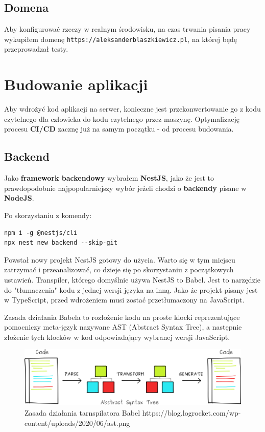 \documentclass{article}
\begin{document}
\subsection{Domena}

Aby konfigurować rzeczy w realnym środowisku, na czas trwania pisania pracy wykupiłem domenę 
\lstinline|https://aleksanderblaszkiewicz.pl|, na której będę przeprowadzał testy.

\section{Budowanie aplikacji} \label{sectionBudowanieAplikacji}

Aby wdrożyć kod aplikacji na serwer, konieczne jest przekonwertowanie go z kodu czytelnego dla człowieka do kodu czytelnego przez maszynę. Optymalizację procesu \textbf{CI/CD} zacznę już na samym początku - od procesu budowania.

\subsection{Backend}

Jako \textbf{framework backendowy} wybrałem \textbf{NestJS}, jako że jest to prawdopodobnie najpopularniejszy wybór jeżeli chodzi o \textbf{backendy} pisane w \textbf{NodeJS}.

Po skorzystaniu z komendy:
\begin{lstlisting}[caption=Komenda uruchamiająca scaffolding projektu NestJS]
npm i -g @nestjs/cli
npx nest new backend --skip-git
\end{lstlisting}

Powstał nowy projekt NestJS gotowy do użycia. Warto się w tym miejscu zatrzymać i przeanalizować, co dzieje się po skorzystaniu z początkowych ustawień. Transpiler, którego domyślnie używa NestJS to Babel. Jest to narzędzie do "tłumaczenia" kodu z jednej wersji języka na inną. Jako że projekt pisany jest w TypeScript, przed wdrożeniem musi zostać przetłumaczony na JavaScript.

Zasada działania Babela to rozłożenie kodu na proste klocki reprezentujące pomocniczy meta-język nazywane AST (Abstract Syntax Tree), a następnie złożenie tych klocków w kod odpowiadający wybranej wersji JavaScript.


\begin{figure}[H]
    \centering
    \includegraphics[width=\textwidth]{ast.png}
    \caption{Zasada działania tarnspilatora Babel https://blog.logrocket.com/wp-content/uploads/2020/06/ast.png}
    \label{fig:ast}
\end{figure}
\end{document}
